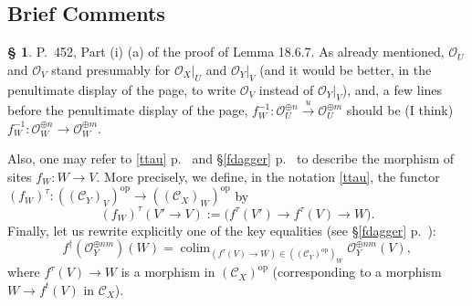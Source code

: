 \documentclass[12pt]{article}
\theoremstyle{remark}
\theoremstyle{definition}
\newtheorem{s}[thm]{\S}
\newcommand{\cc}{\mathcal}
\newcommand{\C}{\mathcal C}
\newcommand{\xr}{\xrightarrow}
\DeclareMathOperator*{\colim}{colim}
\DeclareMathOperator{\op}{op}
\begin{document}

\subsection{Brief Comments} 

\begin{s}
P.~452, Part (i) (a) of the proof of Lemma 18.6.7. As already mentioned, $\cc O_U$ and $\cc O_V$ stand presumably for $\cc O_X|_U$ and $\cc O_Y|_V$ (and it would be better, in the penultimate display of the page, to write $\cc O_V$ instead of $\cc O_Y|_V$), and, a few lines before the penultimate display of the page, $f_W^{-1}:\cc O_U^{\oplus n}\xr u\cc O_U^{\oplus m}$ should be (I think) $f_W^{-1}:\cc O_W^{\oplus n}\to\cc O_W^{\oplus m}$. 

Also, one may refer to \eqref{ttau} p.~\pageref{ttau} and \S\ref{fdagger} p.~\pageref{fdagger} to describe the morphism of sites $f_W:W\to V$. More precisely, we define, in the notation \eqref{ttau}, the functor $(f_W)^\tau:((\C_Y)_V)^{\op}\to((\C_X)_W)^{\op}$ by
$$
(f_W)^\tau(V'\to V):=\big(f^\tau(V')\to f^\tau(V)\to W\big).
$$
Finally, let us rewrite explicitly one of the key equalities (see \S\ref{fdagger} p.~\pageref{fdagger}): 
$$
f^\dagger(\cc O_Y^{\oplus nm})(W)=\colim_{(f^\tau(V)\to W)\in((\C_Y)^{\op})_W}\cc O_Y^{\oplus nm}(V),
$$ 
where $f^\tau(V)\to W$ is a morphism in $(\C_X)^{\op}$ (corresponding to a morphism $W\to f^t(V)$ in $\C_X$).
\end{s}
\printindex
\end{document}
